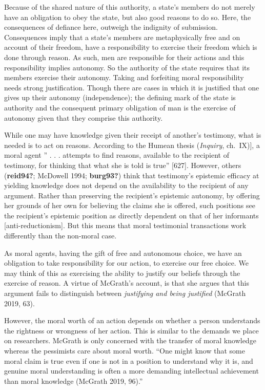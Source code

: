 \documentclass[12pt]{book}
\theoremstyle{definition}
\theoremstyle{remark}
\begin{document}
Because of the shared nature of this authority, a state's members do not merely have an obligation to obey the state, but also good reasons to do so. Here, the consequences of defiance here, outweigh the indignity of submission. Consequences imply that a state's members are metaphysically free and on account of their freedom, have a responsibility to exercise their freedom which is done through reason. As such, men are responsible for their actions and this responsibility implies autonomy. So the authority of the state requires that its members exercise their autonomy. Taking and forfeiting moral responsibility needs strong justification. Though there are cases in which it is justified that one gives up their autonomy (independence); the defining mark of the state is authority and the consequent primary obligation of man is the exercise of autonomy given that they comprise this authority.

While one may have knowledge given their receipt of another's testimony, what is needed is to act on reasons. According to the Humean thesis (\emph{Inquiry}, ch.~IX){]}, a moral agent '' . . . attempts to find reasons, available to the recipient of testimony, for thinking that what she is told is true'' {[}627{]}. However, others (\textbf{reid94?}; McDowell 1994; \textbf{burg93?}) think that testimony's epistemic efficacy at yielding knowledge does not depend on the availability to the recipient of any argument. Rather than preserving the recipient's epistemic autonomy, by offering her grounds of her own for believing the claims she is offered, such positions see the recipient's epistemic position as directly dependent on that of her informants {[}anti-reductionism{]}. But this means that moral testimonial transactions work differently than the non-moral case.

As moral agents, having the gift of free and autonomous choice, we have an obligation to take responsibility for our action, to exercise our free choice. We may think of this as exercising the ability to justify our beliefs through the exercise of reason. A virtue of McGrath's account, is that she argues that this argument fails to distinguish between \emph{justifying and being justified} (McGrath 2019, 63).

However, the moral worth of an action depends on whether a person understands the rightness or wrongness of her action. This is similar to the demands we place on researchers. McGrath is only concerned with the transfer of moral knowledge whereas the pessimists care about moral worth. ``One might know that some moral claim is true even if one is not in a position to understand why it is, and genuine moral understanding is often a more demanding intellectual achievement than moral knowledge (McGrath 2019, 96).''
\end{document}
